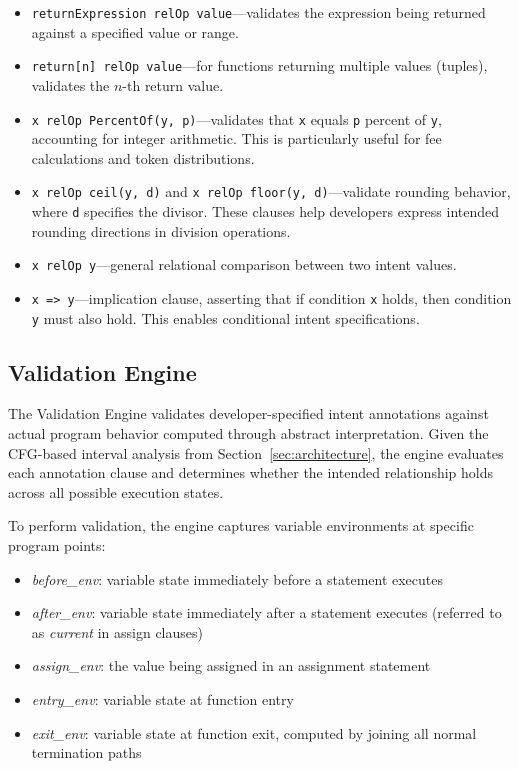 \documentclass[pdflatex,sn-basic]{sn-jnl}%
\theoremstyle{thmstyleone}%
\theoremstyle{thmstyletwo}%
\theoremstyle{thmstylethree}%
\begin{document}
\begin{itemize}
    \item \texttt{returnExpression relOp value}---validates the expression being returned against a specified value or range.

    \item \texttt{return[n] relOp value}---for functions returning multiple values (tuples), validates the $n$-th return value.

    \item \texttt{x relOp PercentOf(y, p)}---validates that \texttt{x} equals \texttt{p} percent of \texttt{y}, accounting for integer arithmetic. This is particularly useful for fee calculations and token distributions.

    \item \texttt{x relOp ceil(y, d)} and \texttt{x relOp floor(y, d)}---validate rounding behavior, where \texttt{d} specifies the divisor. These clauses help developers express intended rounding directions in division operations.

    \item \texttt{x relOp y}---general relational comparison between two intent values.

    \item \texttt{x => y}---implication clause, asserting that if condition \texttt{x} holds, then condition \texttt{y} must also hold. This enables conditional intent specifications.
\end{itemize}

\subsection{Validation Engine}

The Validation Engine validates developer-specified intent annotations against actual program behavior computed through abstract interpretation.
Given the CFG-based interval analysis from Section~\ref{sec:architecture}, the engine evaluates each annotation clause and determines whether the intended relationship holds across all possible execution states.

To perform validation, the engine captures variable environments at specific program points:
\begin{itemize}
    \item \textit{before\_env}: variable state immediately before a statement executes
    \item \textit{after\_env}: variable state immediately after a statement executes (referred to as \textit{current} in assign clauses)
    \item \textit{assign\_env}: the value being assigned in an assignment statement
    \item \textit{entry\_env}: variable state at function entry
    \item \textit{exit\_env}: variable state at function exit, computed by joining all normal termination paths
\end{itemize}
\end{document}
